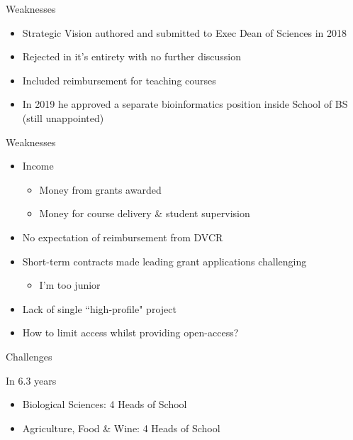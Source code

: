 \documentclass[11pt]{beamer}
\begin{document}
\begin{frame}{Weaknesses}

	\begin{itemize}
		\item Strategic Vision authored and submitted to Exec Dean of Sciences in 2018
		\item Rejected in it's entirety with no further discussion
		\item Included reimbursement for teaching courses
		\item In 2019 he approved a separate bioinformatics position inside School of BS (still unappointed)\\[1cm]

	\end{itemize}

\end{frame}

\begin{frame}{Weaknesses}

	\begin{itemize}
		\item Income
		\begin{itemize}
			\item Money from grants awarded
			\item Money for course delivery \& student supervision
		\end{itemize}		 
		\item No expectation of reimbursement from DVCR
		\item Short-term contracts made leading grant applications challenging
		\begin{itemize}
			\item I'm too junior
		\end{itemize}
		\item Lack of single ``high-profile" project
		\item How to limit access whilst providing open-access?\\[1cm]
	\end{itemize}

\end{frame}

\begin{frame}{Challenges}

In 6.3 years

	\begin{itemize}
		\item Biological Sciences: 4 Heads of School
		\item Agriculture, Food \& Wine: 4 Heads of School	
	\end{itemize}

\end{frame}
\end{document}
